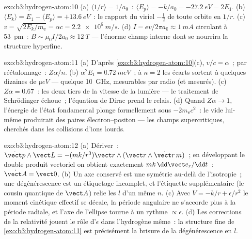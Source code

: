 \begin{solution}{exo:b3:hydrogen-atom:10}
(a) $\langle 1/r\rangle = 1/a_0$~: $\langle E_p\rangle = -k/a_0 =
\qty{-27.2}{eV} = 2E_1$. (b) $\langle E_k\rangle = E_1 - \langle
E_p\rangle = +\qty{13.6}{eV}$~: le rapport du viriel $-\tfrac12$ de
toute orbite en $1/r$. (c) $v = \sqrt{2E_k/m_{\text{e}}} = \alpha c =
\qty{2.2e6}{m/s}$. (d) $I = ev/2\pi a_0 \approx \qty{1}{mA}$
circulant à \qty{53}{pm}~: $B \sim \mu_0I/2a_0 \approx
\qty{12}{T}$ --- l'énorme champ interne dont se nourrira la structure
hyperfine.
\end{solution}

\begin{solution}{exo:b3:hydrogen-atom:11}
(a) D'après \cref{exo:b3:hydrogen-atom:10}(c), $v/c = \alpha$~;
par réétalonnage~: $Z\alpha/n$. (b) $\alpha^2E_{\text{I}} = \qty{0.72}{meV}$~;
à $n = 2$ les écarts sortent à quelques dizaines de
$\unit{\micro eV}$ --- quelque \qty{10}{GHz}, mesurables par radio (et
mesurés). (c) $Z\alpha =
0.67$~: les deux tiers de la vitesse de la lumière --- le traitement
de Schrödinger échoue~; l'équation de Dirac prend le relais. (d) Quand
$Z\alpha \to 1$, l'énergie de l'état fondamental plonge formellement
sous $-2m_{\text{e}}c^2$~: le vide lui-même produirait des paires
électron--positon --- les champs supercritiques, cherchés dans les
collisions d'ions lourds.
\end{solution}

\begin{solution}{exo:b3:hydrogen-atom:12}
(a) Dériver~: $\dot{\vect p}\wedge\vect L = -(mk/r^3)\vect
r\wedge(\vect r\wedge\dot{\vect r}\,m)$~; en développant le double
produit vectoriel on obtient exactement $mk\,\dd\vect e_r/\dd t$~: $\dot{\vect A} =
\vect 0$. (b) Un axe conservé est une symétrie au-delà de
l'isotropie~; une dégénérescence est un étiquetage incomplet, et
l'étiquette supplémentaire (le cousin quantique de $\vect
A$) relie les $l$ d'un même $n$. (c) Avec
$V = -k/r + \epsilon/r^2$ le moment cinétique effectif se décale, la
période angulaire ne s'accorde plus à la période radiale, et l'axe de
l'ellipse tourne à un rythme $\propto\epsilon$. (d) Les corrections de
la relativité jouent le rôle d'$\epsilon$ dans l'hydrogène même~: la
structure fine de \cref{exo:b3:hydrogen-atom:11} est précisément la
brisure de la dégénérescence en $l$.
\end{solution}

